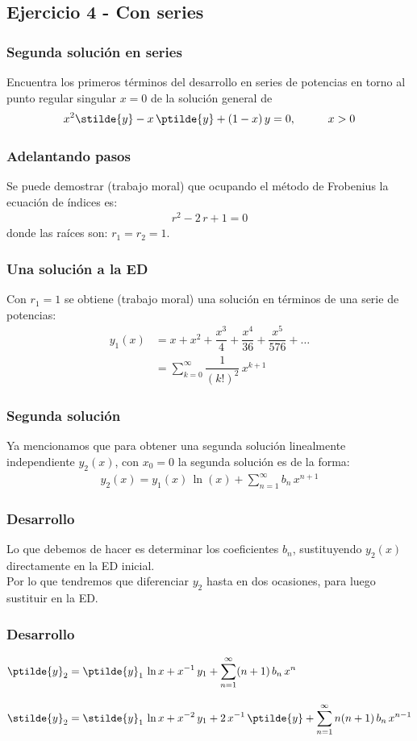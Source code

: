 \subsection{Ejercicio 4 - Con series}
\begin{frame}
\frametitle{Segunda solución en series}
Encuentra los primeros términos del desarrollo en series de potencias en torno al punto regular singular $x = 0$ de la solución general de
\begin{align*}
x^{2} \stilde{y}  - x \, \ptilde{y} + (1 - x) \, y = 0, \hspace{1cm} x > 0
\end{align*} 
\end{frame}
\begin{frame}
\frametitle{Adelantando pasos}
Se puede demostrar (trabajo moral) que ocupando el método de Frobenius la ecuación de índices es:
\begin{align*}
r^{2} - 2 \, r + 1 = 0
\end{align*}
donde las raíces son: $r_{1} = r_{2} = 1$.
\end{frame}
\begin{frame}
\frametitle{Una solución a la ED}
Con $r_{1} = 1$ se obtiene (trabajo moral) una solución en términos de una serie de potencias:
\begin{align*}
y_{1}(x) &= x + x^{2} + \dfrac{x^{3}}{4} + \dfrac{x^{4}}{36} + \dfrac{x^{5}}{576} + \ldots \\[1em]
&= \sum_{k=0}^{\infty} \dfrac{1}{(k!)^{2}} \, x^{k+1}
\end{align*}
\end{frame}
\begin{frame}
\frametitle{Segunda solución}
Ya mencionamos que para obtener una segunda solución linealmente independiente $y_{2}(x)$, con $x_{0}=0$ la segunda solución es de la forma:
\begin{align*}
y_{2} (x) = y_{1}(x) \, \ln (x) + \sum_{n=1}^{\infty} b_{n} \, x^{n+1}
\end{align*}
\end{frame}
\begin{frame}
\frametitle{Desarrollo}
Lo que debemos de hacer es determinar los coeficientes $b_{n}$, sustituyendo $y_{2}(x)$ directamente en la ED inicial.
\\
\bigskip
\pause
Por lo que tendremos que diferenciar $y_{2}$ hasta en dos ocasiones, para luego sustituir en la ED.
\end{frame}
\begin{frame}
\frametitle{Desarrollo}
\begin{align*}
\ptilde{y}_{2} &= \ptilde{y}_{1} \, \ln x + x^{-1} \, y_{1} + \sum_{n=1}^{\infty} (n + 1) \, b_{n} \, x^{n} \\[1em]
\stilde{y}_{2} &= \stilde{y}_{1} \, \ln x + x^{-2} \, y_{1} + 2 \, x^{-1} \, \ptilde{y} + \sum_{n=1}^{\infty} n (n + 1) \, b_{n} \, x^{n-1}
\end{align*}
\end{frame}
